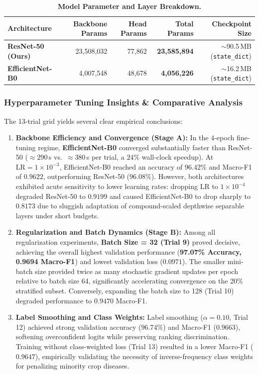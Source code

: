 \begin{table}[h]
\centering
\small
\caption{\textbf{Model Parameter and Layer Breakdown.}}
\label{tab:parameter_counts}
\begin{tabular}{@{}lrrrr@{}}
\toprule
\textbf{Architecture} & \textbf{Backbone Params} & \textbf{Head Params} & \textbf{Total Params} & \textbf{Checkpoint Size} \\
\midrule
\textbf{ResNet-50 (Ours)} & 23,508,032 & 77,862 & \textbf{23,585,894} & $\sim$90.5\,MB (\texttt{state\_dict}) \\
\textbf{EfficientNet-B0} & 4,007,548 & 48,678 & \textbf{4,056,226} & $\sim$16.2\,MB (\texttt{state\_dict}) \\
\bottomrule
\end{tabular}
\end{table}

\subsubsection{Hyperparameter Tuning Insights \& Comparative Analysis}
The 13-trial grid yields several clear empirical conclusions:
\begin{enumerate}[leftmargin=*]
    \item \textbf{Backbone Efficiency and Convergence (Stage A):} In the 4-epoch fine-tuning regime, \textbf{EfficientNet-B0} converged substantially faster than ResNet-50 ($\approx 290$\,s vs.\ $\approx 380$\,s per trial, a $24\%$ wall-clock speedup). At $\text{LR} = 1 \times 10^{-3}$, EfficientNet-B0 reached an accuracy of $96.42\%$ and Macro-F1 of $0.9622$, outperforming ResNet-50 ($96.08\%$). However, both architectures exhibited acute sensitivity to lower learning rates: dropping $\text{LR}$ to $1 \times 10^{-4}$ degraded ResNet-50 to $0.9199$ and caused EfficientNet-B0 to drop sharply to $0.8173$ due to sluggish adaptation of compound-scaled depthwise separable layers under short budgets.
    \item \textbf{Regularization and Batch Dynamics (Stage B):} Among all regularization experiments, \textbf{Batch Size = 32 (Trial 9)} proved decisive, achieving the overall highest validation performance (\textbf{97.07\% Accuracy, 0.9694 Macro-F1}) and lowest validation loss ($0.0971$). The smaller mini-batch size provided twice as many stochastic gradient updates per epoch relative to batch size 64, significantly accelerating convergence on the 20\% stratified subset. Conversely, expanding the batch size to 128 (Trial 10) degraded performance to $0.9470$ Macro-F1.
    \item \textbf{Label Smoothing and Class Weights:} Label smoothing ($\alpha = 0.10$, Trial 12) achieved strong validation accuracy ($96.74\%$) and Macro-F1 ($0.9663$), softening overconfident logits while preserving ranking discrimination. Training without class-weighted loss (Trial 13) resulted in a lower Macro-F1 ($0.9647$), empirically validating the necessity of inverse-frequency class weights for penalizing minority crop diseases.
\end{enumerate}


